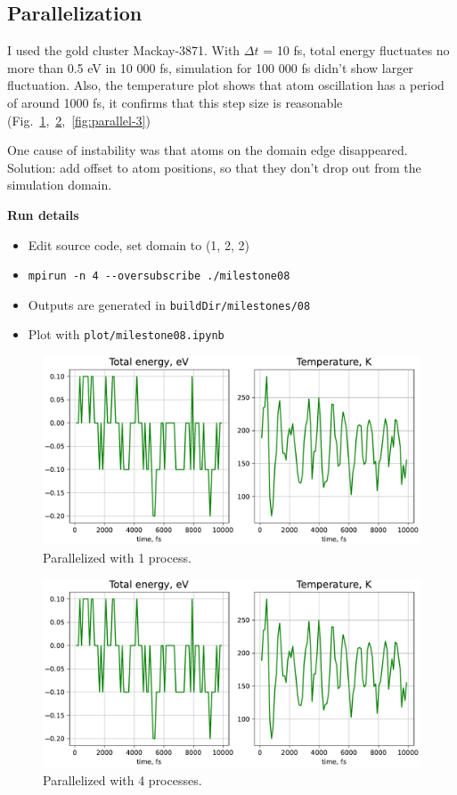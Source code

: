 \documentclass[12pt,a4paper]{article}
\begin{document}
\subsection*{Parallelization}

I used the gold cluster Mackay-3871. With $\Delta t$ = 10 fs, total energy fluctuates no more than 0.5 eV in 10 000 fs, simulation for 100 000 fs didn't show larger fluctuation. Also, the temperature plot shows that atom oscillation has a period of around 1000 fs, it confirms that this step size is reasonable (Fig.~\ref{fig:parallel-1},~\ref{fig:parallel-2},~\ref{fig:parallel-3})

One cause of instability was that atoms on the domain edge disappeared. Solution: add offset to atom positions, so that they don't drop out from the simulation domain.

{\bf Run details}
\begin{itemize}
	\item Edit source code, set domain to (1, 2, 2)
	\item \verb|mpirun -n 4 --oversubscribe ./milestone08|
	\item Outputs are generated in \verb|buildDir/milestones/08|
	\item Plot with \verb|plot/milestone08.ipynb|
\end{itemize}

\begin{figure}[h!]
	\centering
	\includegraphics[width=.8\linewidth]{img/milestone08-1proc.pdf}
	\caption{Parallelized with 1 process.}
	\label{fig:parallel-1}
\end{figure}

\begin{figure}[h!]
	\centering
	\includegraphics[width=.85\linewidth]{img/milestone08-4proc.pdf}
	\caption{Parallelized with 4 processes.}
	\label{fig:parallel-2}
\end{figure}
\end{document}
